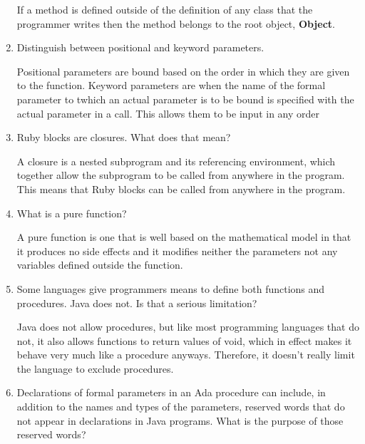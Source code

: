 \begin{enumerate}
  \begin{answer}
   If a method is defined outside of the definition of any class that the programmer writes then the method belongs to the root object, \textbf{Object}.
  \end{answer}

  \item Distinguish between positional and keyword parameters.

  \begin{answer}
   Positional parameters are bound based on the order in which they are given to the function. Keyword parameters are when the name of the formal parameter to twhich an actual parameter is to be bound is specified with the actual parameter in a call. This allows them to be input in any order
  \end{answer}

  \item Ruby blocks are closures. What does that mean?

  \begin{answer}
   A closure is a nested subprogram and its referencing environment, which together allow the subprogram to be called from anywhere in the program. This means that Ruby blocks can be called from anywhere in the program.
  \end{answer}

  \item What is a pure function?

  \begin{answer}
   A pure function is one that is well based on the mathematical model in that it produces no side effects and it modifies neither the parameters not any variables defined outside the function.
  \end{answer}

  \item Some languages give programmers means to define
    both functions and procedures. Java does not. Is that
    a serious limitation?

  \begin{answer}
   Java does not allow procedures, but like most programming languages that do not, it also allows functions to return values of void, which in effect makes it behave very much like a procedure anyways. Therefore, it doesn't really limit the language to exclude procedures.
  \end{answer}

  \item Declarations of formal parameters in an Ada procedure
    can include, in addition to the names and types of the
    parameters, reserved words that do not appear in declarations
    in Java programs. 
    What is the purpose of those reserved words?


\end{enumerate}
